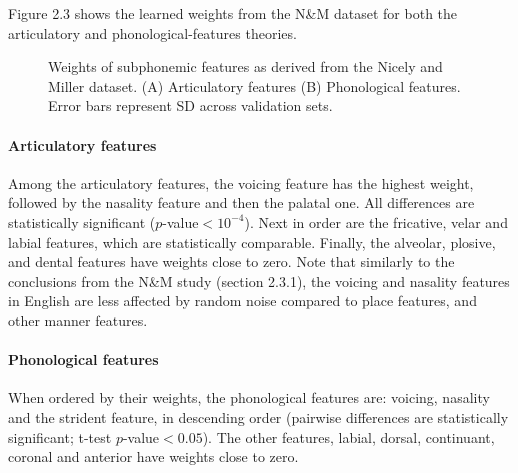 Figure 2.3 shows the learned weights from the N\&M dataset for both the articulatory and phonological-features theories.

\begin{figure}
\caption{Weights of subphonemic features as derived from the Nicely and Miller dataset. (A) Articulatory features (B) Phonological features. Error bars represent SD across validation sets.}
\end{figure}

\paragraph{Articulatory features} Among the articulatory features, the voicing feature has the highest weight, followed by the nasality feature and then the palatal one. All differences are statistically significant ($p$-value$<10^{-4}$). Next in order are the fricative, velar and labial features, which are statistically comparable. Finally, the alveolar, plosive, and dental features have weights close to zero. Note that similarly to the conclusions from the N\&M study (section 2.3.1), the voicing and nasality features in English are less affected by random noise compared to place features, and other manner features.

\paragraph{Phonological features} When ordered by their weights, the phonological features are: voicing, nasality and the strident feature, in descending order (pairwise differences are statistically significant; t-test $p$-value$<0.05$). The other features, labial, dorsal, continuant, coronal and anterior have weights close to zero. 

